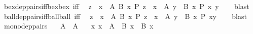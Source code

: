 \begin{isabellebody}
\begin{isamarkuptext}
\end{isamarkuptext}\isamarkuptrue%
\isamarkupfalse%
\ bex{\isacharunderscore}{\kern0pt}dep{\isacharunderscore}{\kern0pt}pairs{\isacharunderscore}{\kern0pt}iff{\isacharunderscore}{\kern0pt}bex{\isacharunderscore}{\kern0pt}bex\ {\isacharbrackleft}{\kern0pt}iff{\isacharbrackright}{\kern0pt}{\isacharcolon}{\kern0pt}\isanewline
\ \ {\isachardoublequoteopen}{\isacharparenleft}{\kern0pt}{\isasymexists}z\ {\isasymin}\ {\isasymSum}x\ {\isasymin}\ A{\isachardot}{\kern0pt}\ B\ x{\isachardot}{\kern0pt}\ P\ z{\isacharparenright}{\kern0pt}\ {\isasymlongleftrightarrow}\ {\isacharparenleft}{\kern0pt}{\isasymexists}x\ {\isasymin}\ A{\isachardot}{\kern0pt}\ {\isasymexists}y\ {\isasymin}\ B\ x{\isachardot}{\kern0pt}\ P\ {\isasymlangle}x{\isacharcomma}{\kern0pt}\ y{\isasymrangle}{\isacharparenright}{\kern0pt}{\isachardoublequoteclose}\isanewline
%
\isadelimproof
\ \ %
\endisadelimproof
%
\isatagproof
{}\isamarkupfalse%
\ blast%
\endisatagproof
{\isafoldproof}%
%
\isadelimproof
\isanewline
%
\endisadelimproof
\isanewline
{}\isamarkupfalse%
\ ball{\isacharunderscore}{\kern0pt}dep{\isacharunderscore}{\kern0pt}pairs{\isacharunderscore}{\kern0pt}iff{\isacharunderscore}{\kern0pt}ball{\isacharunderscore}{\kern0pt}ball\ {\isacharbrackleft}{\kern0pt}iff{\isacharbrackright}{\kern0pt}{\isacharcolon}{\kern0pt}\isanewline
\ \ {\isachardoublequoteopen}{\isacharparenleft}{\kern0pt}{\isasymforall}z\ {\isasymin}\ {\isasymSum}x\ {\isasymin}\ A{\isachardot}{\kern0pt}\ B\ x{\isachardot}{\kern0pt}\ P\ z{\isacharparenright}{\kern0pt}\ {\isasymlongleftrightarrow}\ {\isacharparenleft}{\kern0pt}{\isasymforall}x\ {\isasymin}\ A{\isachardot}{\kern0pt}\ {\isasymforall}y\ {\isasymin}\ B\ x{\isachardot}{\kern0pt}\ P\ {\isasymlangle}x{\isacharcomma}{\kern0pt}y{\isasymrangle}{\isacharparenright}{\kern0pt}{\isachardoublequoteclose}\isanewline
%
\isadelimproof
\ \ %
\endisadelimproof
%
\isatagproof
{}\isamarkupfalse%
\ blast%
\endisatagproof
{\isafoldproof}%
%
\isadelimproof
%
\endisadelimproof
%
\isadelimdocument
%
\endisadelimdocument
%
\isatagdocument
%
\isamarkuptrue%
%
\endisatagdocument
{\isafolddocument}%
%
\isadelimdocument
%
\endisadelimdocument
{}\isamarkupfalse%
\ mono{\isacharunderscore}{\kern0pt}dep{\isacharunderscore}{\kern0pt}pairs{\isacharcolon}{\kern0pt}\isanewline
\ \ \ {\isachardoublequoteopen}A\ {\isasymsubseteq}\ A{\isacharprime}{\kern0pt}{\isachardoublequoteclose}\isanewline
\ \ \ {\isachardoublequoteopen}{\isasymAnd}x{\isachardot}{\kern0pt}\ x\ {\isasymin}\ A\ {\isasymLongrightarrow}\ B\ x\ {\isasymsubseteq}\ B{\isacharprime}{\kern0pt}\ x{\isachardoublequoteclose}\isanewline

\end{isabellebody}
